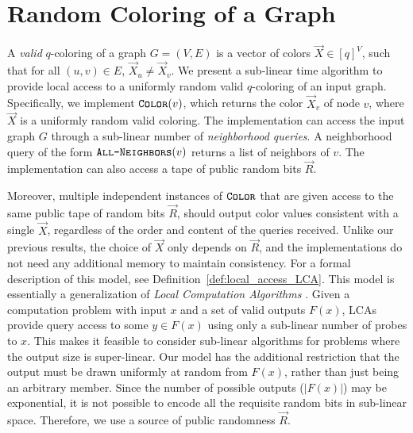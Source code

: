 \section{Random Coloring of a Graph}%
\label{sec:random_coloring_of_a_graph}
A \emph{valid} $q$-coloring of a graph $G=(V, E)$ is a vector of colors $\vec X \in [q]^V$, such that for all $(u,v)\in E$, $\vec X_u \not= \vec X_v$.
We present a sub-linear time algorithm to provide local access to a uniformly random valid $q$-coloring of an input graph.
Specifically, we implement $\texttt{\textsc{Color}}(v)$, which returns the color $\vec X_v$ of node $v$, where $\vec X$ is a uniformly random valid coloring.
The implementation can access the input graph $G$ through a sub-linear number of \emph{neighborhood queries}.
A neighborhood query of the form $\texttt{\textsc{All-Neighbors}}(v)$ returns a list of neighbors of $v$.
The implementation can also access a tape of public random bits $\vec R$.

Moreover, multiple independent instances of $\texttt{\textsc{Color}}$ that are given access to the same public tape of random bits $\vec R$,
should output color values consistent with a single $\vec X$, regardless of the order and content of the queries received.
Unlike our previous results, the choice of $\vec X$ only depends on $\vec R$,
and the  implementations do not need any additional memory to maintain consistency.
For a formal description of this model, see Definition~\ref{def:local_access_LCA}.
This model is essentially a generalization of \emph{Local Computation Algorithms} \cite{LCA}.
Given a computation problem with input $x$ and a set of valid outputs $F(x)$,
LCAs provide query access to some $y\in F(x)$ using only a sub-linear number of probes to $x$.
This makes it feasible to consider sub-linear algorithms for problems where the output size is super-linear.
Our model has the additional restriction that the output must be drawn uniformly at random from $F(x)$, rather than just being an arbitrary member.
Since the number of possible outputs ($|F(x)|$) may be exponential, it is not possible to encode all the requisite random bits in sub-linear space.
Therefore, we use a source of public randomness $\vec R$.

